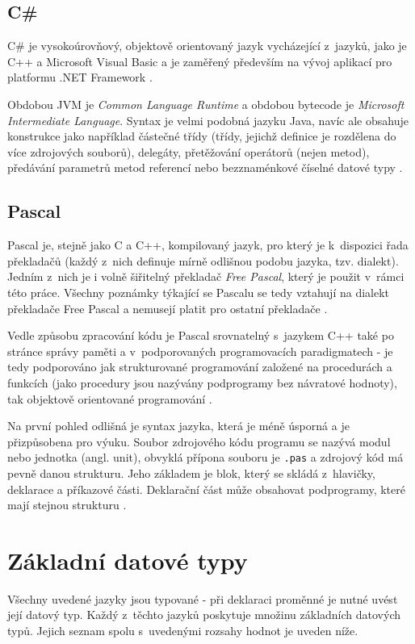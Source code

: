 \documentclass{bakalarka}
\begin{document}
\subsection{C\#}
C\# je vysokoúrovňový, objektově orientovaný jazyk vycházející z~jazyků, jako je C++ a Microsoft Visual Basic a je zaměřený především na vývoj aplikací pro platformu .NET Framework \cite{cs-book, cs-guide-basic}.\par
Obdobou JVM je \textit{Common Language Runtime} a obdobou bytecode je \textit{Microsoft Intermediate Language}. Syntax je velmi podobná jazyku Java, navíc ale obsahuje konstrukce jako například částečné třídy (třídy, jejichž definice je rozdělena do více zdrojových souborů), delegáty, přetěžování operátorů (nejen metod), předávání parametrů metod referencí nebo bezznaménkové číselné datové typy \cite{cs-book, cs-guide-clr, cs-guide-msil, cs-guide-jit, cs-guide-types}.\par

\subsection{Pascal}
Pascal je, stejně jako C a C++, kompilovaný jazyk, pro který je k~dispozici řada překladačů (každý z~nich definuje mírně odlišnou podobu jazyka, tzv. dialekt). Jedním z~nich je i volně šiřitelný překladač \textit{Free Pascal}, který je použit v~rámci této práce. Všechny poznámky týkající se Pascalu se tedy vztahují na dialekt překladače Free Pascal a nemusejí platit pro ostatní překladače \cite{pas-book}.\par
Vedle způsobu zpracování kódu je Pascal srovnatelný s~jazykem C++ také po stránce správy paměti a v~podporovaných programovacích paradigmatech - je tedy podporováno jak strukturované programování založené na procedurách a funkcích (jako procedury jsou nazývány podprogramy bez návratové hodnoty), tak objektově orientované programování \cite{pas-book}.\par
Na první pohled odlišná je syntax jazyka, která je méně úsporná a je přizpůsobena pro výuku. Soubor zdrojového kódu programu se nazývá modul nebo jednotka (angl. unit), obvyklá přípona souboru je \texttt{.pas} a zdrojový kód má pevně danou strukturu. Jeho základem je blok, který se skládá z~hlavičky, deklarace a příkazové části. Deklarační část může obsahovat podprogramy, které mají stejnou strukturu \cite{pas-book, pas-guide-about}.\par

\section{Základní datové typy}
Všechny uvedené jazyky jsou typované - při deklaraci proměnné je nutné uvést její datový typ. Každý z~těchto jazyků poskytuje množinu základních datových typů. Jejich seznam spolu s~uvedenými rozsahy hodnot je uveden níže.
\end{document}
